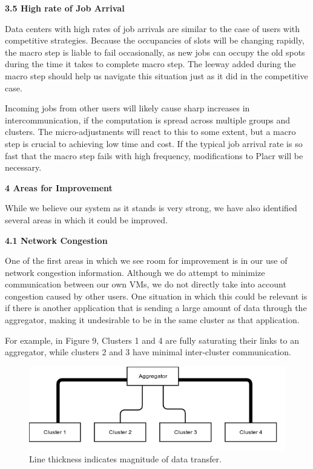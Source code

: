 \documentclass[11pt]{article}
\begin{document}
\Large{\textbf{3.5 High rate of Job Arrival}}

\normalsize

Data centers with high rates of job arrivals are similar to the case of users with competitive strategies.  Because the occupancies of slots will be changing rapidly, the macro step is liable to fail occasionally, as new jobs can occupy the old spots during the time it takes to complete macro step. The leeway added during the macro step should help us navigate this situation just as it did in the competitive case.

Incoming jobs from other users will likely cause sharp increases in intercommunication, if the computation is spread across multiple groups and clusters.  The micro-adjustments will react to this to some extent, but a macro step is crucial to achieving low time and cost.  If the typical job arrival rate is so fast that the macro step fails with high frequency, modifications to Placr will be necessary.

\LARGE{\textbf{4 Areas for Improvement}}

\normalsize

While we believe our system as it stands is very strong, we have also identified several areas in which it could be improved.

\Large{\textbf{4.1 Network Congestion}}

\normalsize

One of the first areas in which we see room for improvement is in our use of network congestion information. Although we do attempt to minimize communication between our own VMs, we do not directly take into account congestion caused by other users.  One situation in which this could be relevant is if there is another application that is sending a large amount of data through the aggregator, making it undesirable to be in the same cluster as that application.

For example, in Figure 9, Clusters 1 and 4 are fully saturating their links to an aggregator, while clusters 2 and 3 have minimal inter-cluster communication.

\begin{figure}
  \centering
\includegraphics[scale=0.7]{cluster_congestion.png}

 \caption{Line thickness indicates magnitude of data transfer.}
 
 \end{figure}
 
\end{document}
